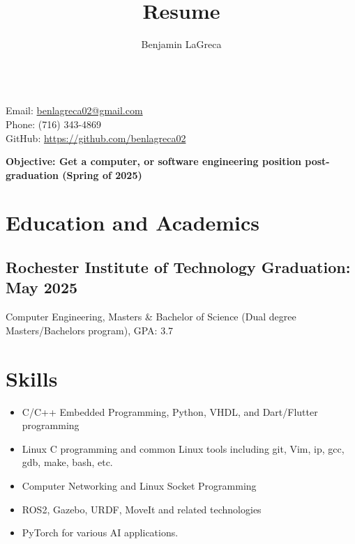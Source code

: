 \documentclass{article}
\title{Resume}
\author{Benjamin LaGreca}
\begin{document}
\begin{center}
    {\Huge\bfseries\underline{\theauthor}} \\
    \vspace{.75em}
    Email: \url{benlagreca02@gmail.com} \\
    Phone: (716) 343-4869 \\
    GitHub: \url{https://github.com/benlagreca02}
    \vspace{.25em}
    
    \bfseries Objective: Get a computer, or software engineering position
    post-graduation (Spring of 2025)
\end{center}

\vspace{-1em}

\section{Education and Academics}

    \subsection{Rochester Institute of Technology \hfill Graduation: May 2025}
    Computer Engineering, Masters \& Bachelor of Science (Dual degree Masters/Bachelors 
    program), GPA: 3.7

\section {Skills}
    \begin{itemize}[noitemsep]
        \item
            C/C++ Embedded Programming, Python, VHDL, and Dart/Flutter programming
        \item
            Linux C programming and common Linux tools including git, Vim, ip, gcc, gdb, make,
            bash, etc.
        \item
            Computer Networking and Linux Socket Programming
        \item
            ROS2, Gazebo, URDF, MoveIt and related technologies
        \item
            PyTorch for various AI applications.


    \end{itemize}
\end{document}
